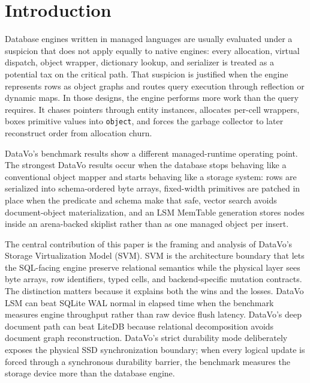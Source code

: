 \documentclass[11pt]{article}
\begin{document}
\section{Introduction}
Database engines written in managed languages are usually evaluated under a suspicion that does not apply equally to native engines: every allocation, virtual dispatch, object wrapper, dictionary lookup, and serializer is treated as a potential tax on the critical path. That suspicion is justified when the engine represents rows as object graphs and routes query execution through reflection or dynamic maps. In those designs, the engine performs more work than the query requires. It chases pointers through entity instances, allocates per-cell wrappers, boxes primitive values into \texttt{object}, and forces the garbage collector to later reconstruct order from allocation churn.

DataVo's benchmark results show a different managed-runtime operating point. The strongest DataVo results occur when the database stops behaving like a conventional object mapper and starts behaving like a storage system: rows are serialized into schema-ordered byte arrays, fixed-width primitives are patched in place when the predicate and schema make that safe, vector search avoids document-object materialization, and an LSM MemTable generation stores nodes inside an arena-backed skiplist rather than as one managed object per insert.

The central contribution of this paper is the framing and analysis of DataVo's Storage Virtualization Model (SVM). SVM is the architecture boundary that lets the SQL-facing engine preserve relational semantics while the physical layer sees byte arrays, row identifiers, typed cells, and backend-specific mutation contracts. The distinction matters because it explains both the wins and the losses. DataVo LSM can beat SQLite WAL normal in elapsed time when the benchmark measures engine throughput rather than raw device flush latency. DataVo's deep document path can beat LiteDB because relational decomposition avoids document graph reconstruction. DataVo's strict durability mode deliberately exposes the physical SSD synchronization boundary; when every logical update is forced through a synchronous durability barrier, the benchmark measures the storage device more than the database engine.
\end{document}

